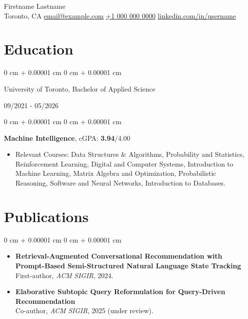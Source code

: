 \documentclass[11pt, letterpaper]{article}
\makeatletter
\newenvironment{highlights}{
    \begin{itemize}[
        topsep=0.08 cm,
        parsep=0.08 cm,
        partopsep=0pt,
        itemsep=0pt,
        leftmargin=0.2 cm + 17pt
    ]
}
{
    \end{itemize}
}
\newenvironment{onecolentry}{
    \begin{adjustwidth}{
        0 cm + 0.00001 cm
    }{
        0 cm + 0.00001 cm
    }
}{
    \end{adjustwidth}
}
\newenvironment{twocolentry}[2][]{
    \onecolentry
    \def\secondColumn{#2}
    \setcolumnwidth{\fill, 4.5 cm}
    \begin{paracol}{2}
}{
    \switchcolumn \raggedleft \secondColumn
    \end{paracol}
    \endonecolentry
}
\newcommand{\contactinfo}{
    \centering
    {\fontsize{25pt}{25pt}\selectfont Firstname Lastname} \\[4pt]
    \vspace{0.3cm}
    \small Toronto, CA \hfill 
    \href{mailto:email@example.com}{email@example.com} \hfill 
    \href{tel:+1-000-000-0000}{+1 000 000 0000} \hfill 
    \href{https://www.linkedin.com/in/username}{linkedin.com/in/username} \\
}
\makeatother
\begin{document}
\contactinfo
\vspace{2pt}

\section{Education}
\vspace{0.08 cm}
\begin{twocolentry}{\footnotesize 09/2021 - 05/2026}
    {University of Toronto}, Bachelor of Applied Science
\end{twocolentry}
\vspace{0.11cm}
\begin{onecolentry}
\hspace{0.3cm}\textbf{Machine Intelligence},  cGPA: {\textbf{3.94}}/4.00
\vspace{0.07cm}
    \begin{highlights}
        \item Relevant Courses: Data Structures \& Algorithms, Probability and Statistics, Reinforcement Learning, Digital and Computer Systems, Introduction to Machine Learning, Matrix Algebra and Optimization, Probabilistic Reasoning, Software and Neural Networks, Introduction to Databases.
    \end{highlights}
\end{onecolentry}

\section{Publications}
\vspace{0.08 cm}
\begin{onecolentry}
    \begin{highlights}
    \item \textbf{Retrieval-Augmented Conversational Recommendation with Prompt-Based Semi-Structured Natural Language State Tracking} \\
    First-author, \textit{ACM SIGIR}, 2024. 
    \vspace{0.1cm}
    \item \textbf{Elaborative Subtopic Query Reformulation for Query-Driven Recommendation} \\
    Co-author, \textit{ACM SIGIR}, 2025 (under review).
    \end{highlights}
\end{onecolentry}
\end{document}
